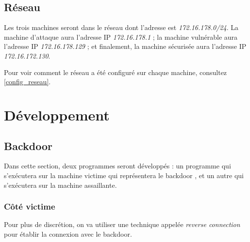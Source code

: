 \subsection{Réseau}
    Les trois machines seront dans le réseau \cite{reseau} dont l'adresse est \emph{172.16.178.0/24}. 
    La machine d'attaque aura l'adresse IP \emph{172.16.178.1} ; la machine vulnérable aura l'adresse IP 
    \emph{172.16.178.129} ; et finalement, la machine sécurisée aura l'adresse IP \emph{172.16.172.130}. %

    Pour voir comment le réseau a été configuré sur chaque machine, consultez \autoref{config_reseau}. %


\section{Développement}
    \subsection{Backdoor}
    Dans cette section, deux programmes seront développés : un programme qui s'exécutera sur la machine victime
    qui représentera le backdoor , et un autre qui s'exécutera sur la machine assaillante. %


        \subsubsection{Côté victime}
        Pour plus de discrétion, on va utiliser une technique appelée \emph{reverse connection} pour établir la connexion
        avec le backdoor. %

